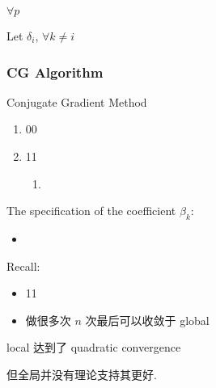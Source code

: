 \begin{corollary}
    $\forall p$
\end{corollary}

\begin{lemma}
    Let $\delta_i$,  $\forall k\ne i$
\end{lemma}

\subsubsection{CG Algorithm}




Conjugate Gradient Method
\begin{enumerate}
    \item 00
    \item 11
    \begin{enumerate}
        \item 
    \end{enumerate}
\end{enumerate}

The specification of the coefficient $\beta_k$:
\begin{itemize}
    \item 
\end{itemize}

Recall: 
\begin{itemize}
    \item 11
    \item 做很多次 $n$ 次最后可以收敛于 global
\end{itemize}
local 达到了 quadratic convergence

但全局并没有理论支持其更好. 

